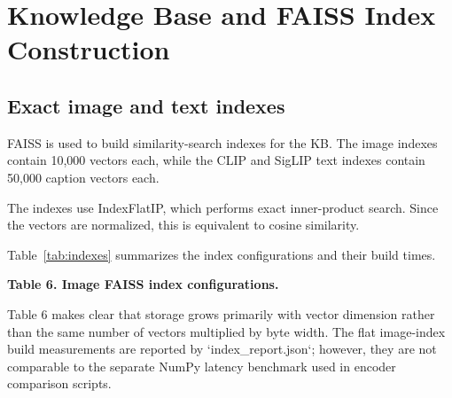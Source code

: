 \documentclass{article}
\begin{document}
\section{Knowledge Base and FAISS Index
Construction}\label{knowledge-base-and-faiss-index-construction}

\subsection{Exact image and text
indexes}\label{exact-image-and-text-indexes}

FAISS \cite{johnson_billion-scale_2021} is used to build similarity-search indexes for the KB.
The image indexes contain 10,000 vectors each, while the CLIP and
SigLIP text indexes contain 50,000 caption vectors each.

The indexes use IndexFlatIP, which performs exact inner-product
search. Since the vectors are normalized, this is equivalent to
cosine similarity. 

Table~\ref{tab:indexes} summarizes the index configurations
and their build times.

\begin{center}
\textbf{Table 6. Image FAISS index configurations.}
\end{center}
\label{tab:indexes}

\begin{table}[htbp]
\centering
{}
\end{table}

Table 6 makes clear that storage grows primarily with vector dimension
rather than the same number of vectors multiplied by byte width. The
flat image-index build measurements are reported by
`index\_report.json`; however, they are not comparable to the separate
NumPy latency benchmark used in encoder comparison scripts.
\end{document}
